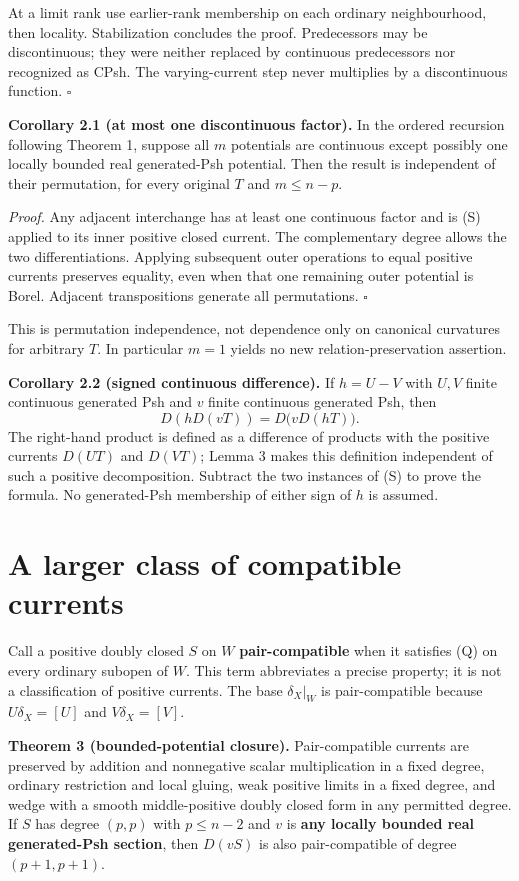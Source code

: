 \documentclass[
  11pt,
]{article}
\begin{document}
At a limit rank use earlier-rank membership on each ordinary
neighbourhood, then locality. Stabilization concludes the proof.
Predecessors may be discontinuous; they were neither replaced by
continuous predecessors nor recognized as CPsh. The varying-current step
never multiplies by a discontinuous function. \(\square\)

\textbf{Corollary 2.1 (at most one discontinuous factor).} In the
ordered recursion following Theorem 1, suppose all \(m\) potentials are
continuous except possibly one locally bounded real generated-Psh
potential. Then the result is independent of their permutation, for
every original \(T\) and \(m\leq n-p\).

\emph{Proof.} Any adjacent interchange has at least one continuous
factor and is (S) applied to its inner positive closed current. The
complementary degree allows the two differentiations. Applying
subsequent outer operations to equal positive currents preserves
equality, even when that one remaining outer potential is Borel.
Adjacent transpositions generate all permutations. \(\square\)

This is permutation independence, not dependence only on canonical
curvatures for arbitrary \(T\). In particular \(m=1\) yields no new
relation-preservation assertion.

\textbf{Corollary 2.2 (signed continuous difference).} If \(h=U-V\) with
\(U,V\) finite continuous generated Psh and \(v\) finite continuous
generated Psh, then
\[D(hD(vT))=D\bigl(vD(hT)\bigr).                             \tag{12}\]
The right-hand product is defined as a difference of products with the
positive currents \(D(UT)\) and \(D(VT)\); Lemma 3 makes this definition
independent of such a positive decomposition. Subtract the two instances
of (S) to prove the formula. No generated-Psh membership of either sign
of \(h\) is assumed.

\section{A larger class of compatible
currents}\label{a-larger-class-of-compatible-currents}

Call a positive doubly closed \(S\) on \(W\) \textbf{pair-compatible}
when it satisfies (Q) on every ordinary subopen of \(W\). This term
abbreviates a precise property; it is not a classification of positive
currents. The base \(\delta_X|_W\) is pair-compatible because
\(U\delta_X=[U]\) and \(V\delta_X=[V]\).

\textbf{Theorem 3 (bounded-potential closure).} Pair-compatible currents
are preserved by addition and nonnegative scalar multiplication in a
fixed degree, ordinary restriction and local gluing, weak positive
limits in a fixed degree, and wedge with a smooth middle-positive doubly
closed form in any permitted degree. If \(S\) has degree \((p,p)\) with
\(p\leq n-2\) and \(v\) is \textbf{any locally bounded real
generated-Psh section}, then \(D(vS)\) is also pair-compatible of degree
\((p+1,p+1)\).
\end{document}
